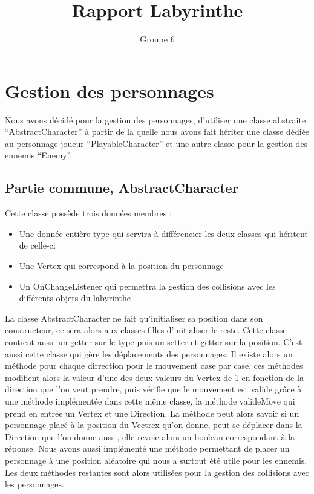 \documentclass [10pt, a4paper]{article}
\title {Rapport Labyrinthe}
\author {Groupe 6}
\begin{document}
\maketitle
\newline
\tableofcontent
\newline

\section {Gestion des personnages}
Nous avons décidé pour la gestion des personnages, d'utiliser une classe abstraite ``AbstractCharacter'' à partir de la quelle nous avons fait hériter une classe dédiée au personnage joueur ``PlayableCharacter'' et une autre classe pour la gestion des ennemis ``Enemy''.

\subsection {Partie commune, AbstractCharacter}
Cette classe possède trois données membres :
\begin {itemize}
\item {Une donnée entière type qui servira à différencier les deux classes qui héritent de celle-ci}
\item {Une Vertex qui correspond à la position du personnage}
\item {Un OnChangeListener qui permettra la gestion des collisions avec les différents objets du labyrinthe}
\end   {itemize}

La classe AbstractCharacter ne fait qu'initialiser sa position dans son constructeur, ce sera alors aux classes filles d'initialiser le reste. Cette classe contient aussi un getter sur le type puis un setter et getter sur la position. C'est aussi cette classe qui gère les déplacements des personnages; Il existe alors un méthode pour chaque dirrection pour le mouvement case par case, ces méthodes modifient alors la valeur d'une des deux valeurs du Vertex de 1 en fonction de la direction que l'on veut prendre, puis vérifie que le mouvement est valide grâce à une méthode implémentée dans cette même classe, la méthode valideMove qui prend en entrée un Vertex et une Direction. La méthode peut alors savoir si un personnage placé à la position du Vectrex qu'on donne, peut se déplacer dans la Direction que l'on donne aussi, elle revoie alors un boolean correspondant à la réponse. Nous avons aussi implémenté une méthode permettant de placer un personnage à une position aléatoire qui nous a surtout été utile pour les ennemis. Les deux méthodes restantes sont alors utilisées pour la gestion des collisions avec les personnages.
\end{document}
